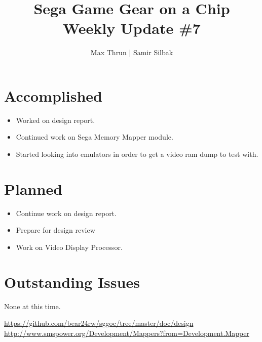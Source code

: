 \documentclass[12pt]{article}
\title{Sega Game Gear on a Chip \\ Weekly Update \#7}
\author{ Max Thrun | Samir Silbak }
\begin{document}
\maketitle

\section*{Accomplished}
\begin{itemize}
    \item Worked on design report. \cite{report}
    \item Continued work on Sega Memory Mapper module. \cite{mapper}
    \item Started looking into emulators in order to get a video ram dump to test with.
\end{itemize}

\section*{Planned}
\begin{itemize}
    \item Continue work on design report.
    \item Prepare for design review
    \item Work on Video Display Processor.
\end{itemize}

\section*{Outstanding Issues}
None at this time.

\vspace{.1in}
\begin{thebibliography}{9}
     \url{https://github.com/bear24rw/sggoc/tree/master/doc/design}
     \url{http://www.smspower.org/Development/Mappers?from=Development.Mapper}
\end{thebibliography}
\end{document}
